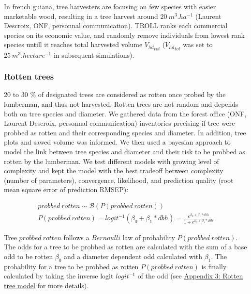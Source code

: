 \documentclass[12pt,]{article}
\theoremstyle{definition}
\theoremstyle{definition}
\theoremstyle{remark}
\begin{document}
In french guiana, tree harvesters are focusing on few species with
easier marketable wood, resulting in a tree harvest around
\(20~m^3.ha^{-1}\) (Laurent Descroix, ONF, personnal communication).
TROLL ranks each commercial species on its economic value, and randomly
remove individuals from lowest rank species untill it reaches total
harvested volume \({V_{hd}}_{tot}\) (\({V_{hd}}_{tot}\) was set to
\(25~m^3.hectare^{-1}\) in subsequent simulations).

\subsubsection{Rotten trees}\label{rotten-trees}

20 to 30 \% of designated trees are considered as rotten once probed by
the lumberman, and thus not harvested. Rotten trees are not random and
depends both on tree species and diameter. We gathered data from the
forest office (ONF, Laurent Descroix, personnal communication)
inventories precising if tree were probbed as rotten and their
corresponding species and diameter. In addition, tree plots and sawed
volume was informed. We then used a bayesian approach to model the link
between tree species and diameter and their risk to be probbed as rotten
by the lumberman. We test different models with growing level of
complexity and kept the model with the best tradeoff between complexity
(number of parameters), convergence, likelihood, and prediction quality
(root mean square error of prediction RMSEP):

\begin{equation}
  \begin{array}{c} 
    probbed~rotten \sim \mathcal{B}(P(probbed~rotten)) \\
    P(probbed~rotten) = logit^{-1}(\beta_0 + \beta_1*dbh) = \frac{e^{\beta_0 + \beta_1*dbh}}{1 + e^{\beta_0 + \beta_1*dbh}}
  \end{array}
  \label{eq:rotten}
\end{equation}

Tree \(probbed~rotten\) follows a \(Bernoulli\) law of probability
\(P(probbed~rotten)\). The odds for a tree to be probbed as rotten are
calculated with the sum of a base odd to be rotten \(\beta_0\) and a
diameter dependent odd calculated with \(\beta_1\). The probability for
a tree to be probbed as rotten \(P(probbed~rotten)\) is finally
calculated by taking the inverse logit \(logit^{-1}\) of the odd (see
\protect\hyperlink{appendix-3-rotten-tree-model}{Appendix 3: Rotten tree
model} for more details).
\end{document}
